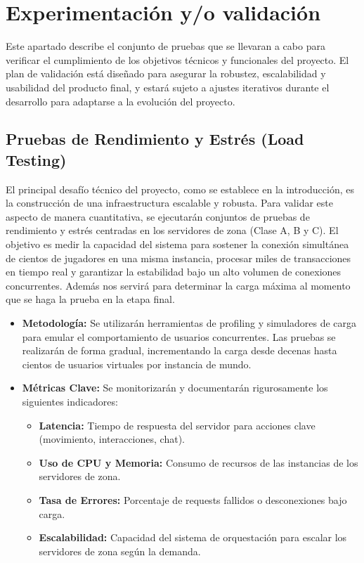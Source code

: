 \section{Experimentación y/o validación}

Este apartado describe el conjunto de pruebas que se llevaran a cabo para verificar el cumplimiento de los objetivos técnicos y funcionales del proyecto.
El plan de validación está diseñado para asegurar la robustez, escalabilidad y usabilidad del producto final,
y estará sujeto a ajustes iterativos durante el desarrollo para adaptarse a la evolución del proyecto.


\subsection{Pruebas de Rendimiento y Estrés (Load Testing)}

El principal desafío técnico del proyecto, como se establece en la introducción, es la construcción de una infraestructura escalable y robusta.
Para validar este aspecto de manera cuantitativa, se ejecutarán conjuntos de pruebas de rendimiento y estrés centradas en los servidores de zona (Clase A, B y C).
El objetivo es medir la capacidad del sistema para sostener la conexión simultánea de cientos de jugadores en una misma instancia,
procesar miles de transacciones en tiempo real y garantizar la estabilidad bajo un alto volumen de conexiones concurrentes.
Además nos servirá para determinar la carga máxima al momento que se haga la prueba en la etapa final.

\begin{itemize}
    \item \textbf{Metodología:} Se utilizarán herramientas de profiling y simuladores de carga para emular el comportamiento de usuarios concurrentes.
    Las pruebas se realizarán de forma gradual, incrementando la carga desde decenas hasta cientos de usuarios virtuales por instancia de mundo.

    \item \textbf{Métricas Clave:} Se monitorizarán y documentarán rigurosamente los siguientes indicadores:
    \begin{itemize}
        \item \textbf{Latencia:} Tiempo de respuesta del servidor para acciones clave (movimiento, interacciones, chat).
        \item \textbf{Uso de CPU y Memoria:} Consumo de recursos de las instancias de los servidores de zona.
        \item \textbf{Tasa de Errores:} Porcentaje de requests fallidos o desconexiones bajo carga.
        \item \textbf{Escalabilidad:} Capacidad del sistema de orquestación para escalar los servidores de zona según la demanda.
    \end{itemize}

\end{itemize}

